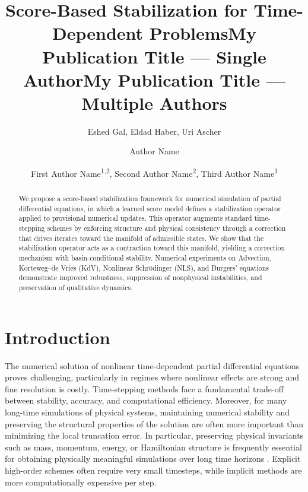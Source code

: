 \documentclass[letterpaper]{article} %
\title{Score-Based Stabilization for Time-Dependent Problems}
\author{
    Eshed Gal, Eldad Haber, Uri Ascher
}
\title{My Publication Title --- Single Author}
\author {
    Author Name
}
\title{My Publication Title --- Multiple Authors}
\author {
    First Author Name\textsuperscript{\rm 1,\rm 2}\equalcontrib,
    Second Author Name\textsuperscript{\rm 2}\equalcontrib,
    Third Author Name\textsuperscript{\rm 1}\corresponding
}
\begin{document}
\maketitle

\begin{abstract}
We propose a score-based stabilization framework for numerical simulation of partial differential equations, in which a learned score model defines a stabilization operator applied to provisional numerical updates. This operator augments standard time-stepping schemes by enforcing structure and physical consistency through a correction that drives iterates toward the manifold of admissible states. We show that the stabilization operator acts as a contraction toward this manifold, yielding a correction mechanism with basin-conditional stability. Numerical experiments on Advection, Korteweg–de Vries (KdV), Nonlinear Schrödinger (NLS), and Burgers’ equations demonstrate improved robustness, suppression of nonphysical instabilities, and preservation of qualitative dynamics.
\end{abstract}




\section{Introduction}

The numerical solution of nonlinear time-dependent partial differential equations proves challenging, particularly in regimes where nonlinear effects are strong and fine resolution is costly. Time-stepping methods face a fundamental trade-off between stability, accuracy, and computational efficiency. Moreover, for many long-time simulations of physical systems, maintaining numerical stability and preserving the structural properties of the solution are often more important than minimizing the local truncation error. In particular, preserving physical invariants such as mass, momentum, energy, or Hamiltonian structure is frequently essential for obtaining physically meaningful simulations over long time horizons \citep{lax1973hyperbolic,leveque2002finite,hlw}. Explicit high-order schemes often require very small timesteps, while implicit methods are more computationally expensive per step.
\end{document}
